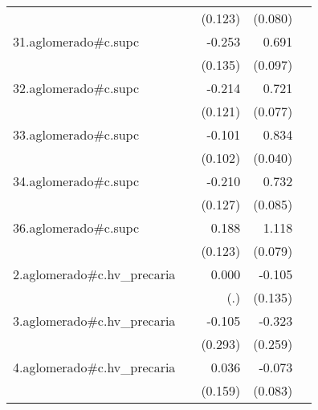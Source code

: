 {\begin{longtable}{l*{4}{D{.}{.}{-1}}}
            &                     &     (0.123)         &     (0.080)         &                     \\
\addlinespace
31.aglomerado#c.supc&                     &      -0.253         &       0.691\sym{***}&                     \\
            &                     &     (0.135)         &     (0.097)         &                     \\
\addlinespace
32.aglomerado#c.supc&                     &      -0.214         &       0.721\sym{***}&                     \\
            &                     &     (0.121)         &     (0.077)         &                     \\
\addlinespace
33.aglomerado#c.supc&                     &      -0.101         &       0.834\sym{***}&                     \\
            &                     &     (0.102)         &     (0.040)         &                     \\
\addlinespace
34.aglomerado#c.supc&                     &      -0.210         &       0.732\sym{***}&                     \\
            &                     &     (0.127)         &     (0.085)         &                     \\
\addlinespace
36.aglomerado#c.supc&                     &       0.188         &       1.118\sym{***}&                     \\
            &                     &     (0.123)         &     (0.079)         &                     \\
\addlinespace
2.aglomerado#c.hv\_precaria&                     &       0.000         &      -0.105         &                     \\
            &                     &         (.)         &     (0.135)         &                     \\
\addlinespace
3.aglomerado#c.hv\_precaria&                     &      -0.105         &      -0.323         &                     \\
            &                     &     (0.293)         &     (0.259)         &                     \\
\addlinespace
4.aglomerado#c.hv\_precaria&                     &       0.036         &      -0.073         &                     \\
            &                     &     (0.159)         &     (0.083)         &                     \\

\end{longtable}}
